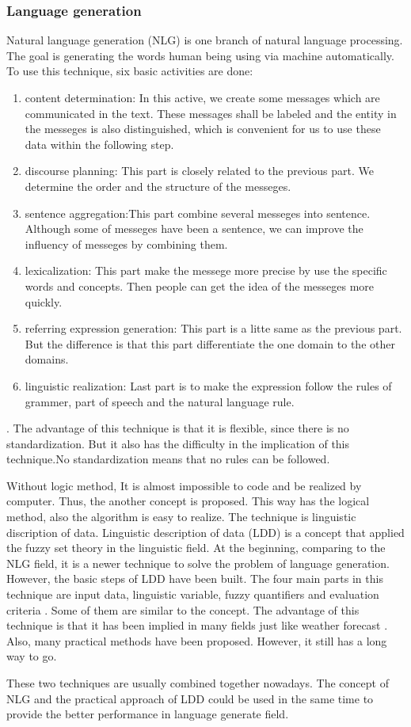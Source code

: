 \subsubsection*{Language generation}

Natural language generation (NLG) is one branch of natural language processing. 
The goal is generating the words human being using via machine automatically. 
To use this technique, six basic activities are done: 
\begin{enumerate}
	\item content determination: In this active, we create some messages which are communicated in the text. 
	These messages shall be labeled and the entity in the messeges is also distinguished, which is convenient for us to 
	use these data within the following step.
	\item discourse planning: This part is closely related to the previous part. 
	We determine the order and the structure of the messeges.
	\item sentence aggregation:This part combine several messeges into sentence. 
	Although some of messeges have been a sentence, we can improve the influency of messeges by combining them.
	\item lexicalization: This part make the messege more precise by use the specific words and concepts. 
	Then people can get the idea of the messeges more quickly.
	\item referring expression generation: This part is a litte same as the previous part. 
	But the difference is that this part differentiate the one domain to the other domains.
	\item linguistic realization: Last part is to make the expression follow the rules of grammer, part of speech and the natural language rule.
\end{enumerate}
\cite{aramossoto2016onthe}. 
The advantage of this technique is that it is flexible, since there is no standardization. 
But it also has the difficulty in the implication of this technique.\cite{aramossoto2016onthe}No standardization means that 
no rules can be followed. 

Without logic method, It is almost impossible to code and be realized by computer.
Thus, the another concept is proposed. This way has the logical method, also the algorithm is easy to realize.
The technique is linguistic discription of data.
Linguistic description of data (LDD) is a concept that applied the fuzzy set theory in the linguistic field. 
At the beginning, comparing to the NLG field, it is a newer technique to solve the problem of language generation. 
However, the basic steps of LDD have been built. 
The four main parts in this technique are input data, linguistic variable, fuzzy quantifiers and evaluation criteria \cite{aramossoto2016onthe}. 
Some of them are similar to the concept. 
The advantage of this technique is that it has been implied in many fields just like weather forecast \cite{Ramos-SotoBBT14}. 
Also, many practical methods have been proposed. 
However, it still has a long way to go.

These two techniques are usually combined together nowadays. 
The concept of NLG and the practical approach of LDD could be used in the same time to provide the better performance in language generate field.

\newpage %